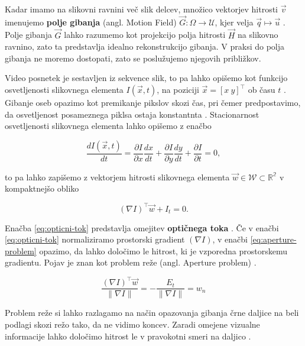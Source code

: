 Kadar imamo na slikovni ravnini več slik delcev, množico vektorjev hitrosti $\vec{v}$ imenujemo \textbf{polje gibanja} (angl. Motion Field) $\vec{G} : \mathit{\Omega} \to \mathcal{U}$, kjer velja $ \vec{q} \mapsto \vec{u}$ \cite{trucco1998introductory}. Polje gibanja $\vec{G}$ lahko razumemo kot projekcijo polja hitrosti $\vec{H}$ na slikovno ravnino, zato ta predstavlja idealno rekonstrukcijo gibanja. V praksi do polja gibanja ne moremo dostopati, zato se poslužujemo njegovih približkov.  

Video posnetek je sestavljen iz sekvence slik, to pa lahko opišemo kot funkcijo osvetljenosti slikovnega elementa $I(\vec{x},t)$, na poziciji $\vec{x} = [x~y]^\top$ ob času $t$ \cite{wedel2011stereo}. Gibanje oseb opazimo kot premikanje pikslov skozi čas, pri čemer predpostavimo, da osvetljenost posameznega piklsa ostaja konstantnta \cite{trucco1998introductory}. Stacionarnost osvetljenosti slikovnega elementa lahko opišemo z enačbo  

\begin{equation}
	\frac{d I(\vec{x}, t)}{dt} = \frac{\partial I}{\partial x} \frac{dx}{dt} + \frac{\partial I}{\partial y} \frac{dy}{dt} + \frac{\partial I}{\partial t} = 0,
\end{equation}

to pa lahko zapišemo z vektorjem hitrosti slikovnega elementa $\vec{w} \in \mathcal{W} \subset \mathbb{R^2}$ v kompaktnejšo obliko

\begin{equation}\label{eq:opticni-tok}
	(\nabla I)^\top \vec{w} + I_t = 0.
\end{equation}

Enačba \eqref{eq:opticni-tok} predstavlja omejitev \textbf{optičnega toka} \cite{trucco1998introductory}. Če v enačbi \eqref{eq:opticni-tok} normaliziramo prostorski gradient $(\nabla I)$, v enačbi \eqref{eq:aperture-problem} opazimo, da lahko  določimo le hitrost, ki je vzporedna prostorskemu gradientu. Pojav je znan kot problem reže (angl. Aperture problem) \cite{trucco1998introductory}. 

\begin{equation}\label{eq:aperture-problem}
	\frac{(\nabla I)^\top \vec{w}}{\| \nabla I \|} = - \frac{E_t}{\| \nabla I \|} = w_n
\end{equation}

Problem reže si lahko razlagamo na način opazovanja gibanja črne daljice na beli podlagi skozi režo tako, da ne vidimo koncev. Zaradi omejene vizualne informacije lahko določimo hitrost le v pravokotni smeri na daljico \cite{trucco1998introductory}. 

